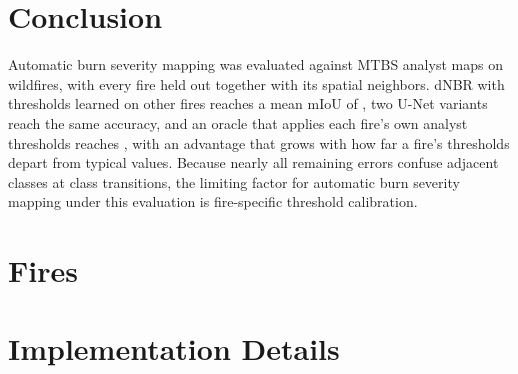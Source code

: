 \documentclass[10pt]{article}
\begin{document}
\section{Conclusion}
\label{sec:conclusion}

Automatic burn severity mapping was evaluated against MTBS analyst maps on \mFires{} wildfires, with every fire held out together with its spatial neighbors.
dNBR with thresholds learned on other fires reaches a mean mIoU of \mdnbrlearnedMiou, two U-Net variants reach the same accuracy, and an oracle that applies each fire's own analyst thresholds reaches \moracleMiou, with an advantage that grows with how far a fire's thresholds depart from typical values.
Because nearly all remaining errors confuse adjacent classes at class transitions, the limiting factor for automatic burn severity mapping under this evaluation is fire-specific threshold calibration.




\clearpage
\appendix

\section{Fires}
\label{app:fires}


\section{Implementation Details}
\label{app:impl}
\end{document}
